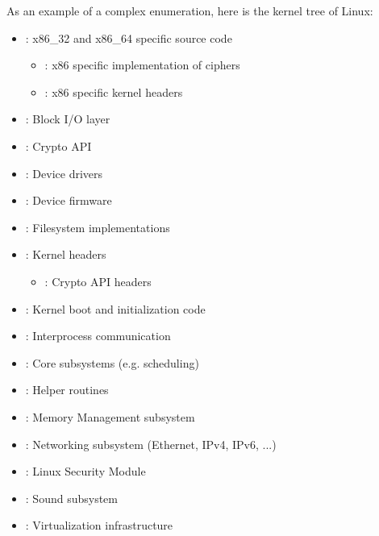 As an example of a complex enumeration, here is
the kernel tree of Linux:
%
\begin{itemize}
	\item \textbf{}: x86\_32 and x86\_64 specific source code
	\begin{itemize}
		\item \textbf{}: x86 specific implementation of ciphers
		\item \textbf{}: x86 specific kernel headers
	\end{itemize}
	\item {}: Block I/O layer
	\item \textbf{}: Crypto API
	\item {}: Device drivers
	\item {}: Device firmware
	\item {}: Filesystem implementations
	\item \textbf{}: Kernel headers
	\begin{itemize}
		\item \textbf{}: Crypto API headers
	\end{itemize}
	\item {}: Kernel boot and initialization code
	\item {}: Interprocess communication
	\item {}: Core subsystems (e.g. scheduling)
	\item {}: Helper routines
	\item {}: Memory Management subsystem
	\item {}: Networking subsystem (Ethernet, IPv4, IPv6, ...)
	\item {}: Linux Security Module
	\item {}: Sound subsystem
	\item {}: Virtualization infrastructure
\end{itemize}

\Blindtext[2][1]
